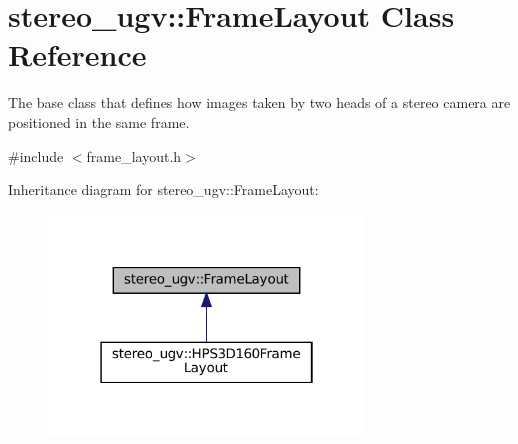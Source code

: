 \hypertarget{classstereo__ugv_1_1FrameLayout}{}\section{stereo\+\_\+ugv\+:\+:Frame\+Layout Class Reference}
\label{classstereo__ugv_1_1FrameLayout}


The base class that defines how images taken by two heads of a stereo camera are positioned in the same frame.  




{\ttfamily \#include $<$frame\+\_\+layout.\+h$>$}



Inheritance diagram for stereo\+\_\+ugv\+:\+:Frame\+Layout\+:\nopagebreak
\begin{figure}[H]
\begin{center}
\leavevmode
\includegraphics[width=238pt]{classstereo__ugv_1_1FrameLayout__inherit__graph}
\end{center}
\end{figure}

